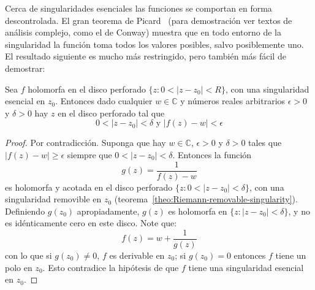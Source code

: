   Cerca de singularidades esenciales las funciones
  se comportan en forma descontrolada.
  El gran teorema de Picard~%
    \cite{picard79:_sur_propr_fonct_entier}
  (para demostración ver textos de análisis complejo,
   como el de Conway\cite{conway78:_funct_one_compl_variab_i})
  muestra que en todo entorno de la singularidad
  la función toma todos los valores posibles,%
  salvo posiblemente uno.
  El resultado siguiente es mucho más restringido,
  pero también más fácil de demostrar:
  \begin{theorem}
    \label{theo:Casorati-Weierstrass}
    Sea \(f\) holomorfa en el disco perforado
    \(\{ z \colon 0 < \lvert z - z_0 \rvert < R \}\),
    con una singularidad esencial en \(z_0\).
    Entonces dado cualquier \(w \in \mathbb{C}\)
    y números reales arbitrarios
    \(\epsilon > 0\) y \(\delta > 0\)
    hay \(z\) en el disco perforado tal que
    \begin{equation*}
      0 < \lvert z - z_0 \rvert < \delta
      \text{\ y\ }
      \lvert f(z) - w \rvert < \epsilon
    \end{equation*}
  \end{theorem}
  \begin{proof}
    Por contradicción.%
    Suponga que hay \(w \in \mathbb{C}\),
    \(\epsilon > 0\) y	\(\delta > 0\) tales que
    \(\lvert f(z) - w \lvert \ge \epsilon\)
    siempre que \(0 < \lvert z - z_0 \rvert < \delta\).
    Entonces la función
    \begin{equation*}
      g(z)
	= \frac{1}{f(z) - w}
    \end{equation*}
    es holomorfa y acotada en el disco perforado
    \(\{ z \colon 0 < \lvert z - z_0 \rvert < \delta \}\),
    con una singularidad removible en \(z_0\)
    (teorema~\ref{theo:Riemann-removable-singularity}).
    Definiendo \(g(z_0)\) apropiadamente,
    \(g(z)\) es holomorfa
    en \(\{ z \colon \lvert z - z_0 \rvert < \delta \}\),
    y no es idénticamente cero en este disco.
    Note que:
    \begin{equation*}
      f(z)
	= w + \frac{1}{g(z)}
    \end{equation*}
    con lo que si \(g(z_0) \ne 0\),
    \(f\) es derivable en \(z_0\);
    si \(g(z_0) = 0\) entonces \(f\) tiene un polo en \(z_0\).
    Esto contradice la hipótesis
    de que \(f\) tiene una singularidad esencial
    en \(z_0\).
  \end{proof}

